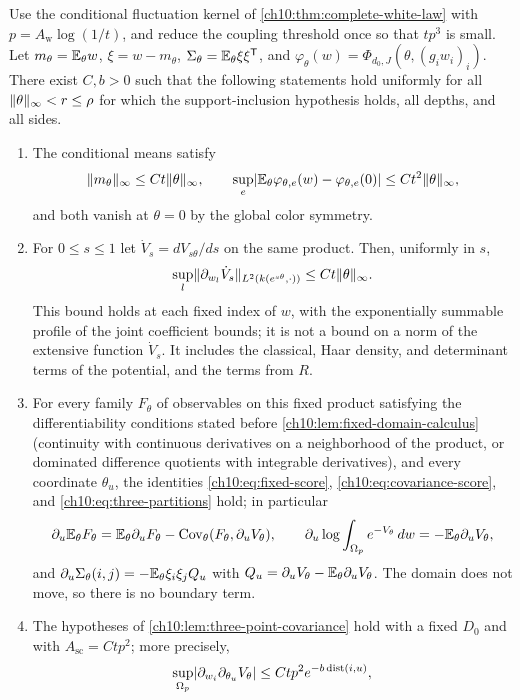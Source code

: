 \begin{theorem}\label{ch10:thm:actual-means-and-scores}
Use the conditional fluctuation kernel of \cref{ch10:thm:complete-white-law} with $p=A_{\mathrm w}\log(1/t)$, and reduce the coupling threshold once so that $tp^3$ is small. Let $m_\theta=\mathbb E_\theta w$, $\xi=w-m_\theta$, $\Sigma_\theta=\mathbb E_\theta\xi\xi^{\mathsf T}$, and $\varphi_\theta(w)=\Phi_{d_0,J}(\theta,(g_iw_i)_i)$. There exist $C,b>0$ such that the following statements hold uniformly for all $\lVert \theta\rVert_\infty<r\le\rho$ for which the support-inclusion hypothesis holds, all depths, and all sides.
\begin{enumerate}
\item The conditional means satisfy
\[
 \lVert m_\theta\rVert_\infty\le Ct\lVert \theta\rVert_\infty,\qquad \sup_e\lvert \mathbb E_\theta\varphi_{\theta,e}(w)-\varphi_{\theta,e}(0)\rvert\le Ct^2\lVert \theta\rVert_\infty,
\]
and both vanish at $\theta=0$ by the global color symmetry.
\item For $0\le s\le1$ let $\dot V_s=dV_{s\theta}/ds$ on the same product. Then, uniformly in $s$,
\[
 \sup_l\lVert \partial_{w_l}\dot V_s\rVert_{L^2(k(e^{s\theta},\cdot))}\le Ct\lVert \theta\rVert_\infty.
\]
This bound holds at each fixed index of $w$, with the exponentially summable profile of the joint coefficient bounds; it is not a bound on a norm of the extensive function $\dot V_s$. It includes the classical, Haar density, and determinant terms of the potential, and the terms from $R$.
\item For every family $F_\theta$ of observables on this fixed product satisfying the differentiability conditions stated before \cref{ch10:lem:fixed-domain-calculus} (continuity with continuous derivatives on a neighborhood of the product, or dominated difference quotients with integrable derivatives), and every coordinate $\theta_u$, the identities \eqref{ch10:eq:fixed-score}, \eqref{ch10:eq:covariance-score}, and \eqref{ch10:eq:three-partitions} hold; in particular
\[
 \partial_u\mathbb E_\theta F_\theta=\mathbb E_\theta\partial_uF_\theta-\operatorname{Cov}_\theta(F_\theta,\partial_uV_\theta),\qquad \partial_u\log\int_{\Omega_p}e^{-V_\theta}\,dw=-\mathbb E_\theta\partial_uV_\theta,
\]
and $\partial_u\Sigma_\theta(i,j)=-\mathbb E_\theta\xi_i\xi_jQ_u$ with $Q_u=\partial_uV_\theta-\mathbb E_\theta\partial_uV_\theta$. The domain does not move, so there is no boundary term.
\item The hypotheses of \cref{ch10:lem:three-point-covariance} hold with a fixed $D_0$ and with $A_{\mathrm{sc}}=Ctp^2$; more precisely,
\begin{gather*}
 \sup_{\Omega_p}\abs{\partial_{w_i}\partial_{\theta_u}V_\theta}\le Ctp^2e^{-b\dist(i,u)},\\

\end{gather*}
\end{enumerate}
\end{theorem}
